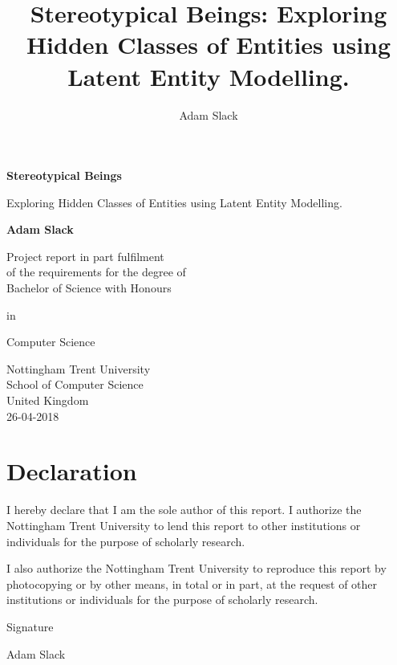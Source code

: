 \documentclass[10pt]{report}
\title{Stereotypical Beings: Exploring Hidden Classes of Entities using Latent Entity Modelling.}
\author{Adam Slack}
\date{}
\begin{document}
 
\begin{titlepage}
    \begin{center}
        \vspace*{1cm}
        
        \Huge\textbf{Stereotypical Beings}
        
        \huge\vspace{0.5cm}
                Exploring Hidden Classes of Entities using Latent Entity Modelling.
                \vspace{1.5cm}


        \large\textbf{Adam Slack}

        \vfill
        
        \normalsize Project report in part fulfilment
        \\of the requirements for the degree of
        \\Bachelor of Science with Honours

        in

        Computer Science
        \vspace{0.8cm}
        
        
        Nottingham Trent University\\
        School of Computer Science\\
        United Kingdom\\
        26-04-2018
        
    \end{center}
\end{titlepage}

\section*{Declaration}

I hereby declare that I am the sole author of this report. I authorize the Nottingham Trent University to lend this report to other institutions or individuals for the purpose of scholarly research.

I also authorize the Nottingham Trent University to reproduce this report by photocopying or by other means, in total or in part, at the request of other institutions or individuals for the purpose of scholarly research.

Signature

Adam Slack

\newpage
{}
\end{document}
